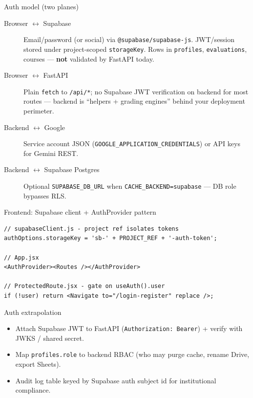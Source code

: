 \documentclass[aspectratio=169]{beamer}
\begin{document}
\begin{frame}{Auth model (two planes)}
  \small
  \begin{description}
    \item[Browser $\leftrightarrow$ Supabase] Email/password (or social) via \texttt{@supabase/supabase-js}. JWT/session stored under project-scoped \texttt{storageKey}. Rows in \texttt{profiles}, \texttt{evaluations}, courses --- \textbf{not} validated by FastAPI today.
    \item[Browser $\leftrightarrow$ FastAPI] Plain \texttt{fetch} to \texttt{/api/*}; no Supabase JWT verification on backend for most routes --- backend is ``helpers + grading engines'' behind your deployment perimeter.
    \item[Backend $\leftrightarrow$ Google] Service account JSON (\texttt{GOOGLE\_APPLICATION\_CREDENTIALS}) or API keys for Gemini REST.
    \item[Backend $\leftrightarrow$ Supabase Postgres] Optional \texttt{SUPABASE\_DB\_URL} when \texttt{CACHE\_BACKEND=supabase} --- DB role bypasses RLS.
  \end{description}
\end{frame}

\begin{frame}[fragile]{Frontend: Supabase client + AuthProvider pattern}
\begin{lstlisting}[style=jsx]
// supabaseClient.js - project ref isolates tokens
authOptions.storageKey = 'sb-' + PROJECT_REF + '-auth-token';

// App.jsx
<AuthProvider><Routes /></AuthProvider>

// ProtectedRoute.jsx - gate on useAuth().user
if (!user) return <Navigate to="/login-register" replace />;
\end{lstlisting}
\end{frame}

\begin{frame}{Auth extrapolation}
  \small
  \begin{itemize}
    \item Attach Supabase JWT to FastAPI (\texttt{Authorization: Bearer}) + verify with JWKS / shared secret.
    \item Map \texttt{profiles.role} to backend RBAC (who may purge cache, rename Drive, export Sheets).
    \item Audit log table keyed by Supabase auth subject id for institutional compliance.
  \end{itemize}
\end{frame}
\end{document}
